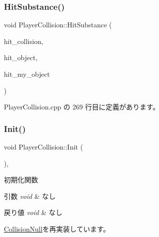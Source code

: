 \subsubsection{\texorpdfstring{Hit\+Substance()}{HitSubstance()}}
{\footnotesize\ttfamily void Player\+Collision\+::\+Hit\+Substance (\begin{DoxyParamCaption}\item[{\mbox{\hyperlink{class_collision_base}{Collision\+Base}} $\ast$}]{hit\+\_\+collision,  }\item[{\mbox{\hyperlink{class_collision_object}{Collision\+Object}} $\ast$}]{hit\+\_\+object,  }\item[{\mbox{\hyperlink{class_collision_object}{Collision\+Object}} $\ast$}]{hit\+\_\+my\+\_\+object }\end{DoxyParamCaption})\hspace{0.3cm}{\ttfamily [private]}}



 Player\+Collision.\+cpp の 269 行目に定義があります。

\mbox{\label{class_player_collision_a3dd6238b75933fd60aee77e92353cc44}} 
\subsubsection{\texorpdfstring{Init()}{Init()}}
{\footnotesize\ttfamily void Player\+Collision\+::\+Init (\begin{DoxyParamCaption}{ }\end{DoxyParamCaption})\hspace{0.3cm}{\ttfamily [override]}, {\ttfamily [virtual]}}



初期化関数 


\begin{DoxyParams}{引数}
{\em void} & なし \\
\hline
\end{DoxyParams}

\begin{DoxyRetVals}{戻り値}
{\em void} & なし \\
\hline
\end{DoxyRetVals}


\mbox{\hyperlink{class_collision_null_a18cfc21fefcd3e8dec380ac44a85f111}{Collision\+Null}}を再実装しています。



